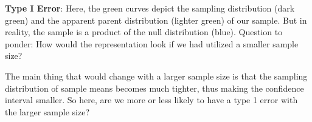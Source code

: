 \documentclass[
  letterpaper,
  DIV=11,
  numbers=noendperiod]{scrreprt}
\begin{document}
\textbf{Type I Error}: Here, the green curves depict the sampling
distribution (dark green) and the apparent parent distribution (lighter
green) of our sample. But in reality, the sample is a product of the
null distribution (blue). Question to ponder: How would the
representation look if we had utilized a smaller sample size?

\begin{figure}


\caption{\label{fig-5-5.type1_samplesize}}

\end{figure}%

The main thing that would change with a larger sample size is that the
sampling distribution of sample means becomes much tighter, thus making
the confidence interval smaller. So here, are we more or less likely to
have a type 1 error with the larger sample size?
\end{document}

